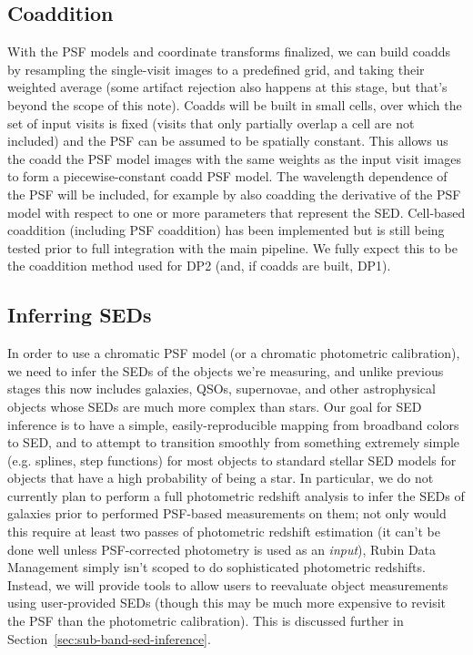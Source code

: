 \documentclass[DM,authoryear,toc]{lsstdoc}
\begin{document}
\subsection{Coaddition}

With the PSF models and coordinate transforms finalized, we can build coadds by resampling the single-visit images to a predefined grid, and taking their weighted average (some artifact rejection also happens at this stage, but that's beyond the scope of this note).
Coadds will be built in small cells, over which the set of input visits is fixed (visits that only partially overlap a cell are not included) and the PSF can be assumed to be spatially constant.
This allows us the coadd the PSF model images with the same weights as the input visit images to form a piecewise-constant coadd PSF model.
The wavelength dependence of the PSF will be included, for example by also coadding the derivative of the PSF model with respect to one or more parameters that represent the SED.
Cell-based coaddition (including PSF coaddition) has been implemented but is still being tested prior to full integration with the main pipeline.
We fully expect this to be the coaddition method used for DP2 (and, if coadds are built, DP1).

\subsection{Inferring SEDs}

In order to use a chromatic PSF model (or a chromatic photometric calibration), we need to infer the SEDs of the objects we're measuring, and unlike previous stages this now includes galaxies, QSOs, supernovae, and other astrophysical objects whose SEDs are much more complex than stars.
Our goal for SED inference is to have a simple, easily-reproducible mapping from broadband colors to SED, and to attempt to transition smoothly from something extremely simple (e.g. splines, step functions) for most objects to standard stellar SED models for objects that have a high probability of being a star.
In particular, we do not currently plan to perform a full photometric redshift analysis to infer the SEDs of galaxies prior to performed PSF-based measurements on them; not only would this require at least two passes of photometric redshift estimation (it can't be done well unless PSF-corrected photometry is used as an \emph{input}), Rubin Data Management simply isn't scoped to do sophisticated photometric redshifts.
Instead, we will provide tools to allow users to reevaluate object measurements using user-provided SEDs (though this may be much more expensive to revisit the PSF than the photometric calibration).
This is discussed further in Section~\ref{sec:sub-band-sed-inference}.
\end{document}
